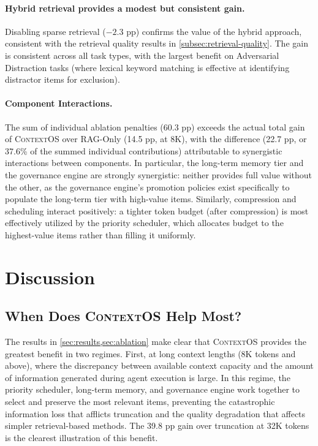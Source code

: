 \documentclass[review,12pt]{elsarticle}
\newcommand{\contextos}{\textsc{ContextOS}}
\begin{document}
\paragraph{Hybrid retrieval provides a modest but consistent gain.}
Disabling sparse retrieval ($-2.3$ pp) confirms the value of the hybrid
approach, consistent with the retrieval quality results in
\cref{subsec:retrieval-quality}.  The gain is consistent across all task types,
with the largest benefit on Adversarial Distraction tasks (where lexical
keyword matching is effective at identifying distractor items for exclusion).

\paragraph{Component Interactions.}
The sum of individual ablation penalties (60.3 pp) exceeds the actual total
gain of \contextos{} over RAG-Only (14.5 pp, at 8K), with the difference
(22.7 pp, or 37.6\% of the summed individual contributions) attributable to
synergistic interactions between components.  In particular, the long-term
memory tier and the governance engine are strongly synergistic: neither
provides full value without the other, as the governance engine's promotion
policies exist specifically to populate the long-term tier with high-value
items.  Similarly, compression and scheduling interact positively: a tighter
token budget (after compression) is most effectively utilized by the priority
scheduler, which allocates budget to the highest-value items rather than
filling it uniformly.

\section{Discussion}
\label{sec:discussion}

\subsection{When Does \contextos{} Help Most?}
\label{subsec:when-helps}

The results in \cref{sec:results,sec:ablation} make clear that \contextos{}
provides the greatest benefit in two regimes.  First, at long context lengths
(8K tokens and above), where the discrepancy between available context capacity
and the amount of information generated during agent execution is large.  In
this regime, the priority scheduler, long-term memory, and governance engine
work together to select and preserve the most relevant items, preventing the
catastrophic information loss that afflicts truncation and the quality
degradation that affects simpler retrieval-based methods.  The 39.8 pp gain
over truncation at 32K tokens is the clearest illustration of this benefit.
\end{document}
